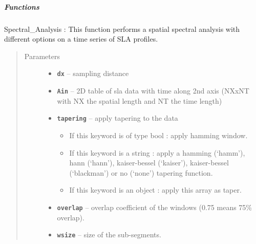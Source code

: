\documentclass[letterpaper,10pt,english]{sphinxmanual}
\begin{document}
\subparagraph{Functions}
\label{altimetry.tools.spectrum:module-altimetry.tools.spectrum}\label{altimetry.tools.spectrum:functions}

\begin{fulllineitems}
\label{altimetry.tools.spectrum:altimetry.tools.spectrum.spectral_analysis}
Spectral\_Analysis :
This function performs a spatial spectral analysis with different options on a time series of SLA profiles.
\begin{quote}\begin{description}
\item[{Parameters}] \leavevmode\begin{itemize}
\item {} 
\textbf{\texttt{dx}} -- sampling distance

\item {} 
\textbf{\texttt{Ain}} -- 2D table of sla data with time along 2nd axis (NXxNT with NX the spatial length and NT the time length)

\item {} 
\textbf{\texttt{tapering}} -- 
apply tapering to the data
\begin{itemize}
\item {} 
If this keyword is of type bool : apply hamming window.

\item {} 
If this keyword is a string : apply a hamming (`hamm'), hann (`hann'), kaiser-bessel (`kaiser'), kaiser-bessel (`blackman') or no (`none') tapering function.

\item {} 
If this keyword is an  object : apply this array as taper.

\end{itemize}


\item {} 
\textbf{\texttt{overlap}} -- overlap coefficient of the windows (0.75 means 75\% overlap).

\item {} 
\textbf{\texttt{wsize}} -- size of the sub-segments.


\end{itemize}
\end{description}
\end{quote}
\end{fulllineitems}
\end{document}
